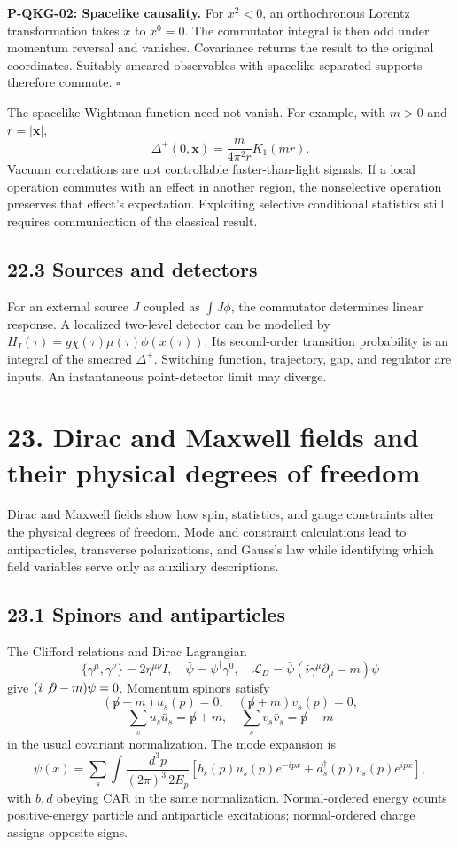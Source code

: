 \documentclass[
  11pt,
  oneside]{book}
\begin{document}
\label{p-qkg-02}{}

\textbf{P-QKG-02: Spacelike causality.} For \(x^2<0\), an orthochronous
Lorentz transformation takes \(x\) to \(x^0=0\). The commutator integral
is then odd under momentum reversal and vanishes. Covariance returns the
result to the original coordinates. Suitably smeared observables with
spacelike-separated supports therefore commute. \(\square\)

The spacelike Wightman function need not vanish. For example, with
\(m>0\) and \(r=|\mathbf x|\), \[
\Delta^+(0,\mathbf x)=\frac{m}{4\pi^2r}K_1(mr).
\] Vacuum correlations are not controllable faster-than-light signals.
If a local operation commutes with an effect in another region, the
nonselective operation preserves that effect's expectation. Exploiting
selective conditional statistics still requires communication of the
classical result.

\section{22.3 Sources and detectors}

For an external source \(J\) coupled as \(\int J\phi\), the commutator
determines linear response. A localized two-level detector can be
modelled by \(H_I(\tau)=g\chi(\tau)\mu(\tau)\phi(x(\tau))\). Its
second-order transition probability is an integral of the smeared
\(\Delta^+\). Switching function, trajectory, gap, and regulator are
inputs. An instantaneous point-detector limit may diverge.

\chapter{23. Dirac and Maxwell fields and their physical degrees of
freedom}\label{ch-23}

Dirac and Maxwell fields show how spin, statistics, and gauge
constraints alter the physical degrees of freedom. Mode and constraint
calculations lead to antiparticles, transverse polarizations, and
Gauss's law while identifying which field variables serve only as
auxiliary descriptions.

\section{23.1 Spinors and antiparticles}

The Clifford relations and Dirac Lagrangian \[
\{\gamma^\mu,\gamma^\nu\}=2\eta^{\mu\nu}I,\quad
\bar\psi=\psi^\dagger\gamma^0,\quad
\mathcal L_D=\bar\psi(i\gamma^\mu\partial_\mu-m)\psi
\] give \((i\not\partial-m)\psi=0\). Momentum spinors satisfy \[
(\not p-m)u_s(p)=0,\quad(\not p+m)v_s(p)=0,
\] \[
\sum_su_s\bar u_s=\not p+m,\quad
\sum_sv_s\bar v_s=\not p-m
\] in the usual covariant normalization. The mode expansion is \[
\psi(x)=\sum_s\int\frac{d^3p}{(2\pi)^3\,2E_p}
\left[b_s(p)u_s(p)e^{-ipx}+d_s^\dagger(p)v_s(p)e^{ipx}\right],
\] with \(b,d\) obeying CAR in the same normalization. Normal-ordered
energy counts positive-energy particle and antiparticle excitations;
normal-ordered charge assigns opposite signs.
\end{document}
